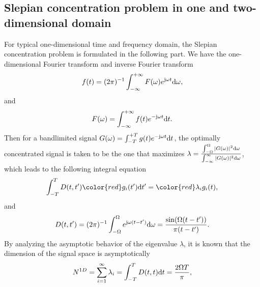 \documentclass[12pt,draftclsnofoot,journal,onecolumn]{IEEEtran}
\begin{document}
	\subsection{Slepian concentration problem in one and two-dimensional domain}
	\label{subsec_1d2d_Selpian}
	For typical one-dimensional time and frequency domain, the Slepian concentration problem is formulated in the following part.
	We have the one-dimensional Fourier transform and inverse Fourier transform
	\begin{equation}
		\begin{aligned}
			f(t) = (2\pi)^{-1}\int_{-\infty}^{+\infty}F(\omega)e^{{\rm j}\omega t}{\rm d}\omega,
		\end{aligned}
	\end{equation}
	and
	\begin{equation}
		\begin{aligned}
			F(\omega) = \int_{-\infty}^{+\infty}f(t)e^{-{\rm j}\omega t}{\rm d}t.
		\end{aligned}
	\end{equation}
	Then for a bandlimited signal $G(\omega) = \int_{-T}^{+T}g(t)e^{-{\rm j}\omega t}{\rm d}t$, the optimally concentrated signal is taken to be the one that maximizes $\lambda = \frac{\int_{-\Omega}^{\Omega}|G(\omega)|^2{\rm d}\omega}{\int_{-\infty}^{\infty}|G(\omega)|^2{\rm d}\omega}$, which leads to the following integral equation
	\begin{equation}
	\begin{aligned}
		\int_{-T}^{T}D(t,t'){\color{red}g_i}(t'){\rm d}t' = {\color{red}\lambda_{i} g_i(t)},
	\end{aligned}
	\label{eqn_1d_t}
	\end{equation}
	and
	\begin{equation}
		\begin{aligned}
			D(t,t') = (2\pi)^{-1}\int_{-\Omega}^\Omega e^{{\rm j}\omega(t-t')}{\rm d}\omega = \frac{\sin(\Omega(t-t'))}{\pi(t-t')}.
		\end{aligned}
	\end{equation}
	By analyzing the asymptotic behavior of the eigenvalue $\lambda$, it is known that the dimension of the signal space is asymptotically
	\begin{equation}
		\begin{aligned}
			N^{1D} = \sum_{i=1}^\infty \lambda_i = \int_{-T}^{T}D(t,t){\rm d}t = \frac{2\Omega T}{\pi},
		\end{aligned}
	\end{equation}
\end{document}
